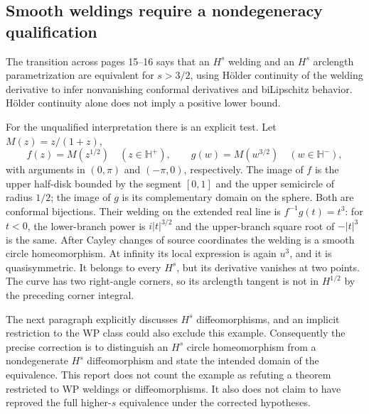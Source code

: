 \documentclass[10pt]{article}
\begin{document}
\subsection*{Smooth weldings require a nondegeneracy qualification}
The transition across pages 15–16 says that an \(H^s\) welding and an \(H^s\) arclength parametrization are equivalent for \(s>3/2\), using Hölder continuity of the welding derivative to infer nonvanishing conformal derivatives and biLipschitz behavior. Hölder continuity alone does not imply a positive lower bound.\par
For the unqualified interpretation there is an explicit test. Let \(M(z)=z/(1+z)\), \[f(z)=M(z^{1/2})\quad(z\in\mathbb H^+),\qquad
 g(w)=M(w^{3/2})\quad(w\in\mathbb H^-),\] with arguments in \((0,\pi)\) and \((-\pi,0)\), respectively. The image of \(f\) is the upper half-disk bounded by the segment \([0,1]\) and the upper semicircle of radius \(1/2\); the image of \(g\) is its complementary domain on the sphere. Both are conformal bijections. Their welding on the extended real line is \(f^{-1}g(t)=t^3\): for \(t<0\), the lower-branch power is \(i|t|^{3/2}\) and the upper-branch square root of \(-|t|^3\) is the same. After Cayley changes of source coordinates the welding is a smooth circle homeomorphism. At infinity its local expression is again \(u^3\), and it is quasisymmetric. It belongs to every \(H^s\), but its derivative vanishes at two points. The curve has two right-angle corners, so its arclength tangent is not in \(H^{1/2}\) by the preceding corner integral.\par
The next paragraph explicitly discusses \(H^s\) diffeomorphisms, and an implicit restriction to the WP class could also exclude this example. Consequently the precise correction is to distinguish an \(H^s\) circle homeomorphism from a nondegenerate \(H^s\) diffeomorphism and state the intended domain of the equivalence. This report does not count the example as refuting a theorem restricted to WP weldings or diffeomorphisms. It also does not claim to have reproved the full higher-\(s\) equivalence under the corrected hypotheses.\par
\end{document}
